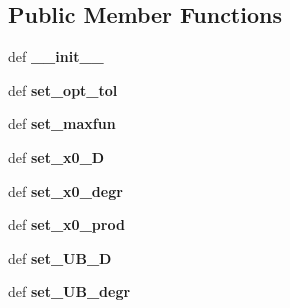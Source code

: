 \subsection*{Public Member Functions}
\begin{DoxyCompactItemize}
\item 
\hypertarget{classpyfrp__subwin_1_1mult__fit__dialog_ae0c1cabf0630351609a48aeba3e171a6}{def {\bfseries \+\_\+\+\_\+init\+\_\+\+\_\+}}\label{classpyfrp__subwin_1_1mult__fit__dialog_ae0c1cabf0630351609a48aeba3e171a6}

\item 
\hypertarget{classpyfrp__subwin_1_1mult__fit__dialog_ad9570ed8145e4d5dbdd9a1e27eafb14d}{def {\bfseries set\+\_\+opt\+\_\+tol}}\label{classpyfrp__subwin_1_1mult__fit__dialog_ad9570ed8145e4d5dbdd9a1e27eafb14d}

\item 
\hypertarget{classpyfrp__subwin_1_1mult__fit__dialog_a5f5baa92741f7f0cc912f425adbaf7f4}{def {\bfseries set\+\_\+maxfun}}\label{classpyfrp__subwin_1_1mult__fit__dialog_a5f5baa92741f7f0cc912f425adbaf7f4}

\item 
\hypertarget{classpyfrp__subwin_1_1mult__fit__dialog_a18dca3ddfcc979dc6ee6958b54fdc8d0}{def {\bfseries set\+\_\+x0\+\_\+\+D}}\label{classpyfrp__subwin_1_1mult__fit__dialog_a18dca3ddfcc979dc6ee6958b54fdc8d0}

\item 
\hypertarget{classpyfrp__subwin_1_1mult__fit__dialog_aee37ed926ae283bd3c36917910aeebe8}{def {\bfseries set\+\_\+x0\+\_\+degr}}\label{classpyfrp__subwin_1_1mult__fit__dialog_aee37ed926ae283bd3c36917910aeebe8}

\item 
\hypertarget{classpyfrp__subwin_1_1mult__fit__dialog_add9cb3874a1bd4ffc6f098a5afddecca}{def {\bfseries set\+\_\+x0\+\_\+prod}}\label{classpyfrp__subwin_1_1mult__fit__dialog_add9cb3874a1bd4ffc6f098a5afddecca}

\item 
\hypertarget{classpyfrp__subwin_1_1mult__fit__dialog_a4b83941b59bb2decfaa11764fc994933}{def {\bfseries set\+\_\+\+U\+B\+\_\+\+D}}\label{classpyfrp__subwin_1_1mult__fit__dialog_a4b83941b59bb2decfaa11764fc994933}

\item 
\hypertarget{classpyfrp__subwin_1_1mult__fit__dialog_a1a32c2164a93d31e639f161dacc4f051}{def {\bfseries set\+\_\+\+U\+B\+\_\+degr}}\label{classpyfrp__subwin_1_1mult__fit__dialog_a1a32c2164a93d31e639f161dacc4f051}


\end{DoxyCompactItemize}
